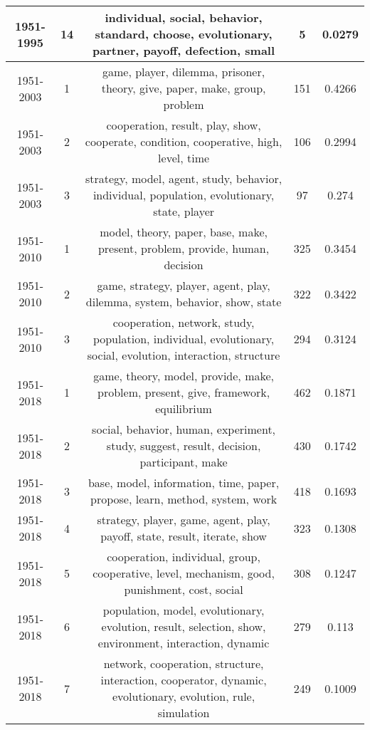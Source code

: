 \begin{tabular}{ccccc}
 1951-1995 &              14 &               individual, social, behavior, standard, choose, evolutionary, partner, payoff, defection, small &                5 &                  0.0279 \\
 \midrule
 1951-2003 &               1 &                                    game, player, dilemma, prisoner, theory, give, paper, make, group, problem &              151 &                  0.4266 \\
 1951-2003 &               2 &                         cooperation, result, play, show, cooperate, condition, cooperative, high, level, time &              106 &                  0.2994 \\
 1951-2003 &               3 &                  strategy, model, agent, study, behavior, individual, population, evolutionary, state, player &               97 &                   0.274 \\
 \midrule
 1951-2010 &               1 &                                  model, theory, paper, base, make, present, problem, provide, human, decision &              325 &                  0.3454 \\
 1951-2010 &               2 &                                   game, strategy, player, agent, play, dilemma, system, behavior, show, state &              322 &                  0.3422 \\
 1951-2010 &               3 &  cooperation, network, study, population, individual, evolutionary, social, evolution, interaction, structure &              294 &                  0.3124 \\
 \midrule
 1951-2018 &               1 &                            game, theory, model, provide, make, problem, present, give, framework, equilibrium &              462 &                  0.1871 \\
 1951-2018 &               2 &                      social, behavior, human, experiment, study, suggest, result, decision, participant, make &              430 &                  0.1742 \\
 1951-2018 &               3 &                                   base, model, information, time, paper, propose, learn, method, system, work &              418 &                  0.1693 \\
 1951-2018 &               4 &                                     strategy, player, game, agent, play, payoff, state, result, iterate, show &              323 &                  0.1308 \\
 1951-2018 &               5 &                 cooperation, individual, group, cooperative, level, mechanism, good, punishment, cost, social &              308 &                  0.1247 \\
 1951-2018 &               6 &        population, model, evolutionary, evolution, result, selection, show, environment, interaction, dynamic &              279 &                   0.113 \\
 1951-2018 &               7 &  network, cooperation, structure, interaction, cooperator, dynamic, evolutionary, evolution, rule, simulation &              249 &                  0.1009 \\
\bottomrule
\end{tabular}

